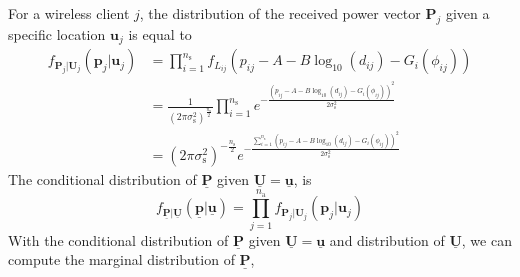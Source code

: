 For a wireless client $j$, the distribution of the received power vector $\mathbf{P}_j$ given a specific location $\mathbf{u}_j$ is equal to
\begin{equation} 
\begin{split}
f_{\mathbf{P}_j | \mathbf{U}_j} (\mathbf{p}_{j} | \mathbf{u}_j)
&= \prod_{i=1}^{n_{\mathrm{s}}}
f_{L_{ij}} ( p_{ij} - A - B \log_{10} (d_{ij}) - G_i(\phi_{ij}) ) \\
&= \frac{1}{\left( 2 \pi \sigma_{\mathrm{s}}^2 \right)^{\frac{n_{\mathrm{s}}}{2} }}
\prod_{i=1}^{n_{\mathrm{s}}} e^{- \frac{( p_{ij} - A - B \log_{10} (d_{ij}) - G_i(\phi_{ij}) )^2}{2 \sigma_{\mathrm{s}}^2} } \\
&= \left( 2 \pi \sigma_{\mathrm{s}}^2 \right)^{- \frac{n_{\mathrm{s}}}{2}}
e^{- \frac{ \sum_{i=1}^{n_{\mathrm{s}}}
		(p_{ij} - A - B \log_{10} (d_{ij}) - G_i(\phi_{ij}))^2}
	{2 \sigma_{\mathrm{s}}^2}} 
\end{split}
\end{equation}
The conditional distribution of $\underline{\mathbf{P}}$ given $\underline{\mathbf{U}}=\underline{\mathbf{u}}$, is
\begin{equation} \label{equation:CondDistP}
f_{\underline{\mathbf{P}} | \underline{\mathbf{U}}}
\left( \underline{\mathbf{p}} | \underline{\mathbf{u}} \right)
= \prod_{j=1}^{n_{\mathrm{a}}}
f_{\mathbf{P}_j | \mathbf{U}_j} (\mathbf{p}_{j}|\mathbf{u}_j) 
\end{equation}
With the conditional distribution of $\underline{\mathbf{P}}$ given $\underline{\mathbf{U}}=\underline{\mathbf{u}}$ and distribution of $\underline{\mathbf{U}}$, we can compute the marginal distribution of $\underline{\mathbf{P}}$,
